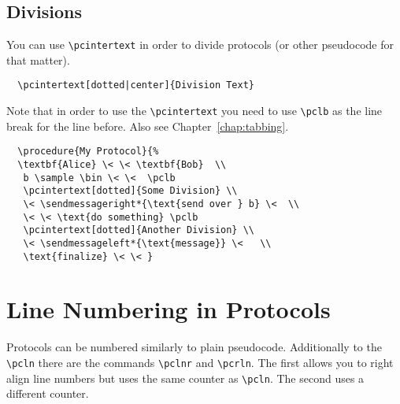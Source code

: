 \documentclass[a4paper]{report}
\begin{document}
  
  \subsection{Divisions}
  You can use \lstinline$\pcintertext$ in order to divide protocols (or other pseudocode for that matter).
  \begin{lstlisting}
  \pcintertext[dotted|center]{Division Text}
  \end{lstlisting}
  Note that in order to use the \lstinline$\pcintertext$ you need to use \lstinline$\pclb$ as the line break for the line
  before. Also see Chapter~\ref{chap:tabbing}.
  
  \begin{center}
  \end{center}
  
  \begin{lstlisting}
  \procedure{My Protocol}{%
  \textbf{Alice} \< \< \textbf{Bob}  \\
   b \sample \bin \< \<  \pclb
   \pcintertext[dotted]{Some Division} \\
   \< \sendmessageright*{\text{send over } b} \<  \\
   \< \< \text{do something} \pclb
   \pcintertext[dotted]{Another Division} \\
   \< \sendmessageleft*{\text{message}} \<   \\
   \text{finalize} \< \< }
  \end{lstlisting}
  
  
  
  \section{Line Numbering in Protocols}
  Protocols can be numbered similarly to plain pseudocode. Additionally to the \lstinline$\pcln$ there are the commands \lstinline$\pclnr$ and \lstinline$\pcrln$. The first
  allows you to right align line numbers but uses the same counter as \lstinline$\pcln$. The second uses a different counter.
  
\end{document}
